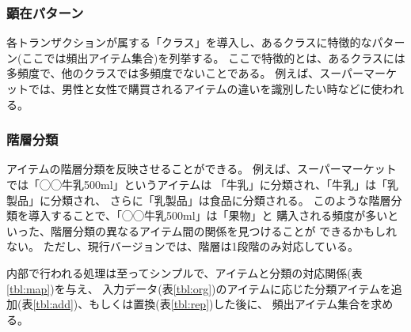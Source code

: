 \documentclass[a4paper]{jarticle}
\begin{document}
\subsubsection*{顕在パターン}
各トランザクションが属する「クラス」を導入し、あるクラスに特徴的なパターン(ここでは頻出アイテム集合)を列挙する。
ここで特徴的とは、あるクラスには多頻度で、他のクラスでは多頻度でないことである。
例えば、スーパーマーケットでは、男性と女性で購買されるアイテムの違いを識別したい時などに使われる。



\subsubsection*{階層分類}
アイテムの階層分類を反映させることができる。
例えば、スーパーマーケットでは「◯◯牛乳500ml」というアイテムは
「牛乳」に分類され、「牛乳」は「乳製品」に分類され、
さらに「乳製品」は食品に分類される。
このような階層分類を導入することで、「◯◯牛乳500ml」は「果物」と
購入される頻度が多いといった、階層分類の異なるアイテム間の関係を見つけることが
できるかもしれない。
ただし、現行バージョンでは、階層は1段階のみ対応している。

内部で行われる処理は至ってシンプルで、アイテムと分類の対応関係(表\ref{tbl:map})を与え、
入力データ(表\ref{tbl:org})のアイテムに応じた分類アイテムを追加(表\ref{tbl:add})、もしくは置換(表\ref{tbl:rep})した後に、
頻出アイテム集合を求める。
\end{document}
